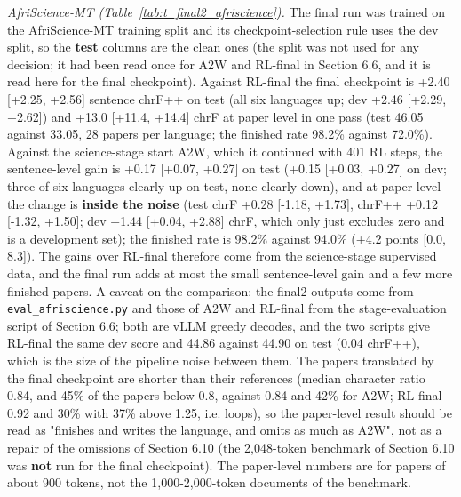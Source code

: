 \emph{AfriScience-MT (Table~\ref{tab:t_final2_afriscience}).} The final run was trained on the AfriScience-MT training split and its checkpoint-selection rule uses the dev split, so the \textbf{test} columns are the clean ones (the split was not used for any decision; it had been read once for A2W and RL-final in Section 6.6, and it is read here for the final checkpoint). Against RL-final the final checkpoint is +2.40 {[}+2.25, +2.56{]} sentence chrF++ on test (all six languages up; dev +2.46 {[}+2.29, +2.62{]}) and +13.0 {[}+11.4, +14.4{]} chrF at paper level in one pass (test 46.05 against 33.05, 28 papers per language; the finished rate 98.2\% against 72.0\%). Against the science-stage start A2W, which it continued with 401 RL steps, the sentence-level gain is +0.17 {[}+0.07, +0.27{]} on test (+0.15 {[}+0.03, +0.27{]} on dev; three of six languages clearly up on test, none clearly down), and at paper level the change is \textbf{inside the noise} (test chrF +0.28 {[}-1.18, +1.73{]}, chrF++ +0.12 {[}-1.32, +1.50{]}; dev +1.44 {[}+0.04, +2.88{]} chrF, which only just excludes zero and is a development set); the finished rate is 98.2\% against 94.0\% (+4.2 points {[}0.0, 8.3{]}). The gains over RL-final therefore come from the science-stage supervised data, and the final run adds at most the small sentence-level gain and a few more finished papers. A caveat on the comparison: the final2 outputs come from \texttt{eval\_afriscience.py} and those of A2W and RL-final from the stage-evaluation script of Section 6.6; both are vLLM greedy decodes, and the two scripts give RL-final the same dev score and 44.86 against 44.90 on test (0.04 chrF++), which is the size of the pipeline noise between them. The papers translated by the final checkpoint are shorter than their references (median character ratio 0.84, and 45\% of the papers below 0.8, against 0.84 and 42\% for A2W; RL-final 0.92 and 30\% with 37\% above 1.25, i.e. loops), so the paper-level result should be read as "finishes and writes the language, and omits as much as A2W", not as a repair of the omissions of Section 6.10 (the 2,048-token benchmark of Section 6.10 was \textbf{not} run for the final checkpoint). The paper-level numbers are for papers of about 900 tokens, not the 1,000-2,000-token documents of the benchmark.

